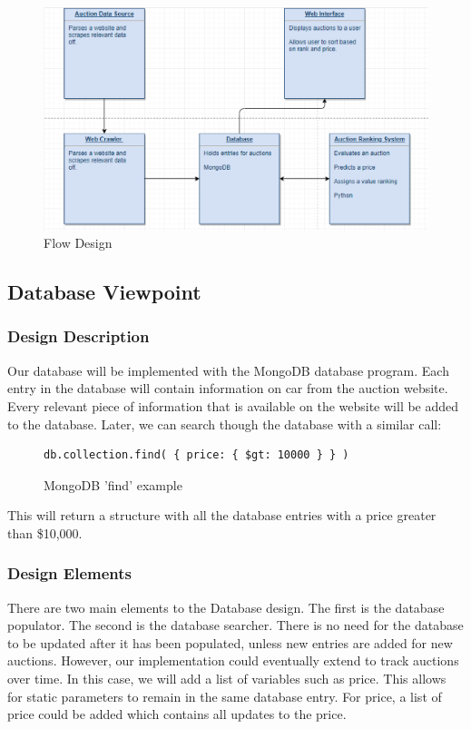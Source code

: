\documentclass[onecolumn, draftclsnofoot, 10pt, compsoc]{IEEEtran}
\begin{document}
\begin{figure}[ht]
\centering
\includegraphics[scale=0.75]{flow_capture}
\caption{Flow Design}
\label{fig:flow}
\end{figure}


\subsection{Database Viewpoint}
\subsubsection{Design Description}
Our database will be implemented with the MongoDB database program.\cite{MongoDB} Each entry in the database will contain information on car from the auction website. Every relevant piece of information that is available on the website will be added to the database. Later, we can search though the database with a similar call: 
\begin{figure}[ht]
\centering
\begin{lstlisting}
db.collection.find( { price: { $gt: 10000 } } )
\end{lstlisting}
\caption{MongoDB 'find' example}
\end{figure}

This will return a structure with all the database entries with a price greater than \$10,000. 

\subsubsection{Design Elements}
There are two main elements to the Database design. The first is the database populator. The second is the database searcher. There is no need for the database to be updated after it has been populated, unless new entries are added for new auctions. However, our implementation could eventually extend to track auctions over time. In this case, we will add a list of variables such as price. This allows for static parameters to remain in the same database entry. For price, a list of price could be added which contains all updates to the price.
\end{document}
